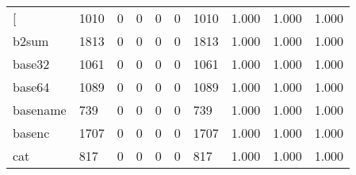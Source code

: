 \begin{longtable}{lp{1.3cm}p{1.3cm}p{1.3cm}p{1.3cm}p{1.3cm}p{1.3cm}p{1.3cm}p{1.3cm}p{1.3cm}}
\bottomrule
\endlastfoot
{[}         &                   1010 &                                  0 &                                 0 &                                0 &                                 0 &                            1010 &                                1.000 &                                  1.000 &                                1.000 \\
b2sum     &                   1813 &                                  0 &                                 0 &                                0 &                                 0 &                            1813 &                                1.000 &                                  1.000 &                                1.000 \\
base32    &                   1061 &                                  0 &                                 0 &                                0 &                                 0 &                            1061 &                                1.000 &                                  1.000 &                                1.000 \\
base64    &                   1089 &                                  0 &                                 0 &                                0 &                                 0 &                            1089 &                                1.000 &                                  1.000 &                                1.000 \\
basename  &                    739 &                                  0 &                                 0 &                                0 &                                 0 &                             739 &                                1.000 &                                  1.000 &                                1.000 \\
basenc    &                   1707 &                                  0 &                                 0 &                                0 &                                 0 &                            1707 &                                1.000 &                                  1.000 &                                1.000 \\
cat       &                    817 &                                  0 &                                 0 &                                0 &                                 0 &                             817 &                                1.000 &                                  1.000 &                                1.000 \\

\end{longtable}
